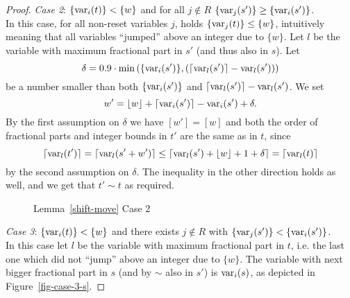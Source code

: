 \documentclass[fleqn,envcountsame]{LMCS}
\newcommand{\ie}{i.e.\xspace}
\newcommand{\floor}[1]{\ensuremath{\lfloor #1 \rfloor}}
\newcommand{\ceil}[1]{\ensuremath{\lceil #1 \rceil}}
\begin{document}
\begin{proof}
\emph{Case 2}: $\{ \mathrm{var}_i(t) \} < \{w\}$ and for all $j \not\in R$
$\{ \mathrm{var}_j(s') \} \geq \{ \mathrm{var}_i(s') \}$.\\
  In this case, for all non-reset variables $j$, holds
  $\{ \mathrm{var}_j(t) \} \leq \{w\}$, intuitively meaning
  that all variables ``jumped'' above an integer due to $\{w\}$.
  Let $l$ be the variable with maximum fractional part in $s'$
  (and thus also in $s$). Let
  \[ \delta = 0.9 \cdot \min\left(
        \{ \var_i(s') \}, \left( \ceil{\var_l(s')} - \var_l(s') \right) 
      \right)\]
  be a number smaller than both $\{ \mathrm{var}_i(s') \}$ and 
  $\ceil{\var_l(s')} - \var_l(s')$. We set
  \[ w' = \floor{w} + \ceil{\var_i(s')} - \var_i(s') + \delta.\]
  By the first assumption on $\delta$ we have $[w'] = [w]$ and both the order
  of fractional parts and integer bounds in $t'$ are the same as in $t$, since
  \[ \ceil{\var_l(t')} = \ceil{\var_l(s'+w')} \leq
     \ceil{\var_l(s') + \floor{w} + 1 + \delta} = \ceil{\var_l(t)} \]
  by the second assumption on $\delta$. The inequality in the other
  direction holds as well, and we get that $t' \sim t$ as required.

\begin{figure}[h]
\begin{center}
\end{center}
\caption{Lemma~\ref{shift-move} Case 2}
\label{fig-case-2}
\end{figure}

\emph{Case 3}: $\{ \mathrm{var}_i(t) \} < \{w\}$ and there exists $j \not\in R$
  with $\{ \mathrm{var}_j(s') \} < \{ \mathrm{var}_i(s') \}$.\\
  In this case let $l$ be the variable with maximum fractional part in $t$,
  \ie the last one which did not ``jump'' above an integer due to $\{w\}$.
  The variable with next bigger fractional part in $s$ (and by $\sim$ also
  in $s'$) is $\mathrm{var}_i(s)$, as depicted in Figure~\ref{fig-case-3-s}.


\end{proof}
\end{document}
